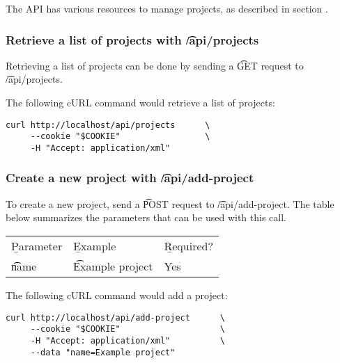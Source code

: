   The API has various resources to manage projects, as described in
  section .

\subsubsection{Retrieve a list of projects with \t{/api/projects}}

  Retrieving a list of projects can be done by sending a \t{GET} request
  to \t{/api/projects}.

  The following cURL command would retrieve a list of projects:

\begin{siderules}
\begin{verbatim}
curl http://localhost/api/projects      \
     --cookie "$COOKIE"                 \
     -H "Accept: application/xml"
\end{verbatim}
\end{siderules}

\subsubsection{Create a new project with \t{/api/add-project}}
\label{sec:api-add-project}

  To create a new project, send a \t{POST} request to
  \t{/api/add-project}.  The table below summarizes the parameters
  that can be used with this call.

  \hypersetup{urlcolor=black}
  \begin{table}[H]
    \begin{tabularx}{\textwidth}{l!{\VRule[-1pt]}X!{\VRule[-1pt]}X}
      \headrow
      \b{Parameter} & \b{Example}         & \b{Required?}\\
      \evenrow
      \t{name}      & \t{Example project} & Yes\\
    \end{tabularx}
  \end{table}
  \hypersetup{urlcolor=LinkGray}

  The following cURL command would add a project:

\begin{siderules}
\begin{verbatim}
curl http://localhost/api/add-project      \
     --cookie "$COOKIE"                    \
     -H "Accept: application/xml"          \
     --data "name=Example project"
\end{verbatim}
\end{siderules}

